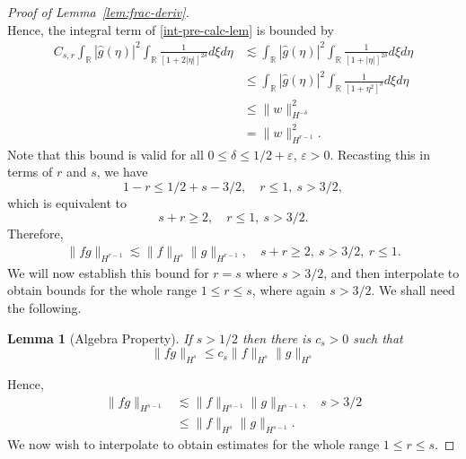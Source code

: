 \documentclass[12pt,reqno]{amsart}
\numberwithin{equation}{section}  %
\numberwithin{figure}{section}
\newcommand{\rr}{\mathbb{R}}
\newcommand{\wh}{\widehat}
\newcommand{\ee}{\varepsilon}
\newtheorem{lemma}[theorem]{Lemma}
\begin{document}
\begin{proof}[Proof of Lemma~\ref{lem:frac-deriv}]
\begin{equation*}
\end{equation*}
%
%
Hence, the integral term of \eqref{int-pre-calc-lem} is bounded by
\begin{equation*}
\begin{split}
  C_{s,r} \int_{\rr}  | \wh{g}(\eta) |^{2} \int_{\rr} \frac{1}{\left[ 1
  + 2 |\eta| \right]^{2 \delta}} d \xi d \eta 
  & \lesssim
  \int_{\rr}  | \wh{g}(\eta) |^{2} \int_{\rr} \frac{1}{\left[ 1
  + |\eta| \right]^{2 \delta}} d \xi d \eta  
  \\
  & \le \int_{\rr}  | \wh{g}(\eta) |^{2} \int_{\rr} \frac{1}{\left[ 1
  + \eta^{2} \right]^{\delta}} d \xi d \eta  
  \\
  & \le \| w \|_{H^{-\delta}}^{2}
  \\
  & = \| w \|_{H^{r-1}}^{2}.
\end{split}
\end{equation*}
%
Note that this bound is valid for all $0 \le \delta \le 1/2 + \ee$, $\ee >
0$. Recasting this in terms of $r$ and $s$, we have 
$$1-r \le 1/2 + s - 3/2, \quad r \le 1, \ s > 3/2,$$ which is equivalent to 
$$s + r \ge 2,  \quad  r \le 1, \ s > 3/2.$$ Therefore, 
%
%
%
%
\begin{equation}
  \label{yhh}
\begin{split}
  \| f g \|_{H^{r-1}} \lesssim \| f \|_{H^{s}} \| g \|_{H^{r-1}},
  \quad s + r \ge 2, \ s > 3/2, \ r \le 1.
\end{split}
\end{equation}
We will now establish this bound for $r=s$ where $s > 3/2$, and then interpolate to obtain
bounds for the whole range $1 \le r \le s$, where again $s > 3/2$. We shall need the following. 
%
%
\begin{lemma}[Algebra Property]
  \label{lem:alg-prop}
If  $s>1/2$ then there is $c_s>0$ such that 
%
%
%
\begin{equation} \label{KP-com-est}
  \| fg\|_{H^{s}} \le c_s \| f \|_{H^{s}} \| g \|_{H^{s}}
\end{equation}
%
%
%
\end{lemma}
%
%
%
%
%
Hence,
%
%
\begin{equation}
  \label{pre-interp-1}
\begin{split}
  \| f g \|_{H^{s-1}}
  & \lesssim   \|f  \|_{H^{s-1}} \| g \|_{H^{s-1}}, \quad s >3/2
  \\
  & \le \| f \|_{H^{s}} \| g \|_{H^{s-1}}.
\end{split}
\end{equation}
%
%
%
%
%
%
%
We now wish to interpolate to obtain estimates for the whole range $1 \le r \le s$.

\end{proof}
\end{document}
